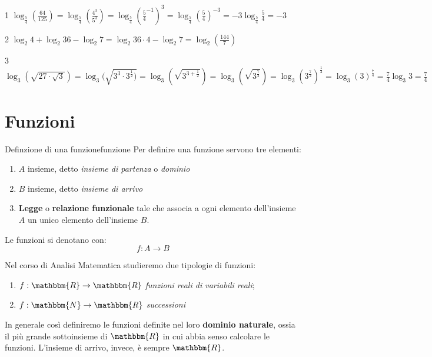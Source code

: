 \documentclass[12pt]{report}
\newcounter{definition}
\newcounter{exercise}
\begin{document}
	\begin{exercise}{}{1}
		$\log_{\frac{5}{4}}{(\frac{64}{125})} = \log_{\frac{5}{4}}{(\frac{4^3}{5^3})} = \log_{\frac{5}{4}}{(\frac{5}{4}^{-1})^3} = \log_{\frac{5}{4}}{(\frac{5}{4})^{-3}} = -3\log_{\frac{5}{4}}{\frac{5}{4}} = -3$
	\end{exercise}
	\begin{exercise}{}{2}
		$\log_{2}{4}+\log_2{36}-\log_2{7} = \log_2{36 \cdot 4} - \log_2{7} = \log_2{(\frac{144}{7})}$
	\end{exercise}
	\begin{exercise}{}{3}
		$\log_{3}{(\sqrt{27 \cdot \sqrt{3}})} = \log_3{(\sqrt{3^3 \cdot 3^\frac{1}{2})}} = \log_3{(\sqrt{3^{3 + \frac{1}{2}}})} = \log_3{(\sqrt{3^\frac{7}{2}})} = \log_3{(3^\frac{7}{2})^\frac{1}{2}} = \log_3{(3)^\frac{7}{4}} = \frac{7}{4}\log_3{3} = \frac{7}{4}$
	\end{exercise}
	\chapter{Funzioni}
	\begin{definition}{Definzione di una funzione}{funzione}
		Per definire una funzione servono tre elementi:
		\begin{enumerate}
			\item $A$ insieme, detto \textit{insieme di partenza} o \textit{dominio}
			\item $B$ insieme, detto \textit{insieme di arrivo}
			\item \textbf{Legge} o \textbf{relazione funzionale} tale che associa a ogni elemento dell'insieme $A$ un unico elemento dell'insieme $B$.
		\end{enumerate}
		Le funzioni si denotano con:
		\[
		f: A \to B
		\]
	\end{definition}
	Nel corso di Analisi Matematica studieremo due tipologie di funzioni:
	\begin{enumerate}
		\item $f: \mathbbm{R} \to \mathbbm{R}$ \textit{funzioni reali di variabili reali};
		\item $f: \mathbbm{N} \to \mathbbm{R}$ \textit{successioni}
	\end{enumerate}
	In generale così definiremo le funzioni definite nel loro \textbf{dominio naturale}, ossia il più grande sottoinsieme di $\mathbbm{R}$ in cui abbia senso calcolare le funzioni. L'insieme di arrivo, invece, è sempre $\mathbbm{R}$.
\end{document}
